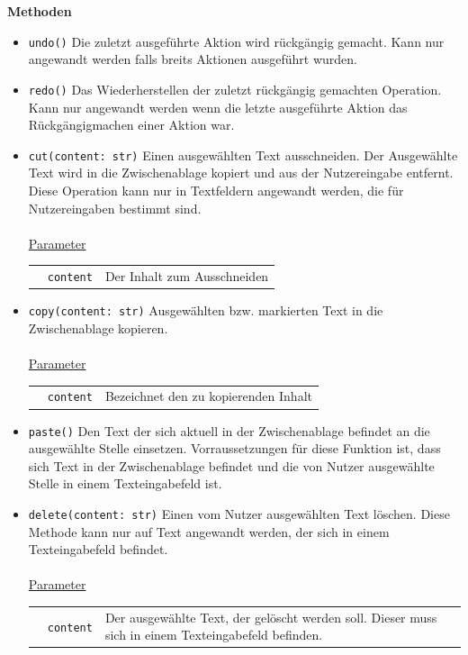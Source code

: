 \documentclass{article}
\begin{document}
\textbf{{Methoden}}
\begin{itemize}
\item \texttt{undo()} \newline Die zuletzt ausgeführte Aktion wird rückgängig gemacht. Kann nur angewandt werden falls breits Aktionen ausgeführt wurden.

\item \texttt{redo()} \newline Das Wiederherstellen der zuletzt rückgängig gemachten Operation. Kann nur angewandt werden wenn die letzte ausgeführte Aktion das Rückgängigmachen einer Aktion war.

\item \texttt{cut(content: str)} \newline Einen ausgewählten Text ausschneiden. Der Ausgewählte Text wird in die Zwischenablage kopiert und aus der Nutzereingabe entfernt. Diese Operation kann nur in Textfeldern angewandt werden, die für Nutzereingaben bestimmt sind.
\\\\
\underline{Parameter}\\ 
\begin{tabular}{lll}
 & \texttt{content} & Der Inhalt zum Ausschneiden\\
\end{tabular}

\item \texttt{copy(content: str)} \newline Ausgewählten bzw. markierten Text in die Zwischenablage kopieren.
\\\\
\underline{{Parameter}}\\
\begin{tabular}{lll}
& \texttt{content} & Bezeichnet den zu kopierenden Inhalt \\
\end{tabular}

\item \texttt{paste()} \newline Den Text der sich aktuell in der Zwischenablage befindet an die ausgewählte Stelle einsetzen. Vorraussetzungen für diese Funktion ist, dass sich Text in der Zwischenablage befindet und die von Nutzer ausgewählte Stelle in einem Texteingabefeld ist.

\item \texttt{delete(content: str)} \newline Einen vom Nutzer ausgewählten Text löschen. Diese Methode kann nur auf Text angewandt werden, der sich in einem Texteingabefeld befindet.
\\\\
\underline{Parameter}\\ 
\begin{tabular}{llp{8.7cm}}
&\texttt{content} & Der ausgewählte Text, der gelöscht werden soll. Dieser muss sich in einem Texteingabefeld befinden.\\
\end{tabular}


\end{itemize}
\end{document}

